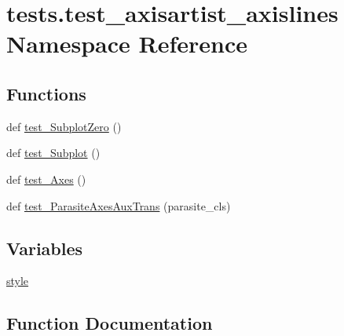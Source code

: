 \hypertarget{namespacetests_1_1test__axisartist__axislines}{}\section{tests.\+test\+\_\+axisartist\+\_\+axislines Namespace Reference}
\label{namespacetests_1_1test__axisartist__axislines}
\subsection*{Functions}
\begin{DoxyCompactItemize}
\item 
def \hyperlink{namespacetests_1_1test__axisartist__axislines_adc0c97d2a04b33fde35c6fc58bc263a4}{test\+\_\+\+Subplot\+Zero} ()
\item 
def \hyperlink{namespacetests_1_1test__axisartist__axislines_a4f1dee41527cbd7a1d9d93ec6c8132eb}{test\+\_\+\+Subplot} ()
\item 
def \hyperlink{namespacetests_1_1test__axisartist__axislines_a85e40a4e522f0148353a2889a4437c5a}{test\+\_\+\+Axes} ()
\item 
def \hyperlink{namespacetests_1_1test__axisartist__axislines_a773cd715837cd6c5699b1851fe2c0c18}{test\+\_\+\+Parasite\+Axes\+Aux\+Trans} (parasite\+\_\+cls)
\end{DoxyCompactItemize}
\subsection*{Variables}
\begin{DoxyCompactItemize}
\item 
\hyperlink{namespacetests_1_1test__axisartist__axislines_a1302d97a3eed3258c5e2858d232e2fc1}{style}
\end{DoxyCompactItemize}


\subsection{Function Documentation}
\mbox{\label{namespacetests_1_1test__axisartist__axislines_a85e40a4e522f0148353a2889a4437c5a}} 
